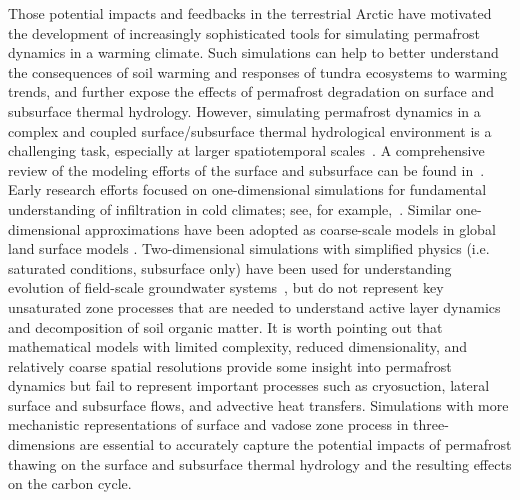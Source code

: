 \documentclass[review,11pt]{elsarticle}
\begin{document}
Those potential impacts and feedbacks in the terrestrial Arctic have motivated the development of increasingly sophisticated tools for simulating permafrost dynamics in a warming climate. Such simulations can help to better understand the consequences of soil warming and responses of tundra ecosystems to warming trends, and further expose the effects of permafrost degradation on surface and subsurface thermal hydrology. However, simulating permafrost dynamics in a complex and coupled surface/subsurface thermal hydrological environment is a challenging task, especially at larger spatiotemporal scales~\cite{painter2013modeling}.  A comprehensive review of the modeling efforts of the surface and subsurface can be found in~\cite{kurylyk2014climate}. Early research efforts focused on one-dimensional simulations for fundamental understanding of infiltration in cold climates; see, for example,~\cite{harlan1973analysis, guymon1974coupled, taylor1978model}. Similar one-dimensional approximations have been adopted as coarse-scale models in global land surface models \cite{takata2003development, nicolsky2007improved, lawrence2012simulation, koven2013analysis}.  Two-dimensional simulations with simplified physics (i.e. saturated conditions, subsurface only) have been used for understanding evolution of field-scale groundwater systems~\cite{mckenzie2007groundwater, bense2009evolution}, but do not represent key unsaturated zone processes that are needed to understand active layer dynamics and decomposition of soil organic matter.   It is worth pointing out that mathematical models with limited complexity, reduced dimensionality, and relatively coarse spatial resolutions provide some insight into permafrost dynamics but fail to represent important processes such as cryosuction, lateral surface and subsurface flows, and advective heat transfers. Simulations with more mechanistic representations of surface and vadose zone process in three-dimensions are essential to accurately capture the potential impacts of permafrost thawing on the surface and subsurface thermal hydrology and the resulting effects on the carbon cycle. 
\end{document}
